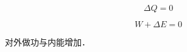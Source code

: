 
\begin{equation}
\Delta Q = 0
\end{equation}

\begin{equation}
W + \Delta E = 0
\end{equation}

对外做功与内能增加．


